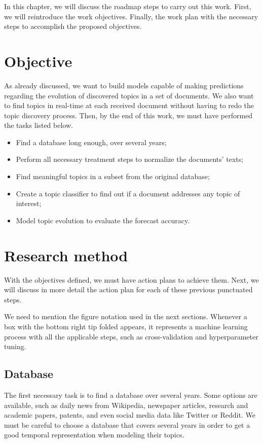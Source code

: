 In this chapter, we will discuss the roadmap steps to carry out this work. First, we will reintroduce the work objectives. Finally, the work plan with the necessary steps to accomplish the proposed objectives.

\section{Objective}

As already discussed, we want to build models capable of making predictions regarding the evolution of discovered topics in a set of documents. We also want to find topics in real-time at each received document without having to redo the topic discovery process. Then, by the end of this work, we must have performed the tasks listed below.

\begin{itemize}
	\item Find a database long enough, over several years;
	\item Perform all necessary treatment steps to normalize the documents' texts;
	\item Find meaningful topics in a subset from the original database;
	\item Create a topic classifier to find out if a document addresses any topic of interest;
	\item Model topic evolution to evaluate the forecast accuracy.
\end{itemize}

\section{Research method}

With the objectives defined, we must have action plans to achieve them. Next, we will discuss in more detail the action plan for each of these previous punctuated steps.

We need to mention the figure notation used in the next sections. Whenever a box with the bottom right tip folded appears, it represents a machine learning process with all the applicable steps, such as cross-validation and hyperparameter tuning.

\subsection{Database}

The first necessary task is to find a database over several years. Some options are available, such as daily news from Wikipedia, newspaper articles, research and academic papers, patents, and even social media data like Twitter or Reddit. We must be careful to choose a database that covers several years in order to get a good temporal representation when modeling their topics.

